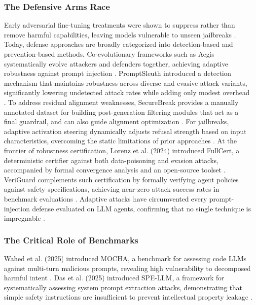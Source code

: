 \documentclass[11pt,a4paper]{article}
\begin{document}
\subsubsection{The Defensive Arms Race}

Early adversarial fine-tuning treatments were shown to suppress rather than remove harmful capabilities, leaving models vulnerable to unseen jailbreaks \cite{Sheshadri_2024_LLMs_ecd68cc1}. Today, defense approaches are broadly categorized into detection-based and prevention-based methods. Co-evolutionary frameworks such as Aegis systematically evolve attackers and defenders together, achieving adaptive robustness against prompt injection \cite{Liu_2025_Aegis_6081be1b}. PromptSleuth introduced a detection mechanism that maintains robustness across diverse and evasive attack variants, significantly lowering undetected attack rates while adding only modest overhead \cite{Wang_2025_Promptsleuth_c8e9516a}. To address residual alignment weaknesses, SecureBreak provides a manually annotated dataset for building post-generation filtering modules that act as a final guardrail, and can also guide alignment optimization \cite{Arazzi_2026_Securebreak_0e3adcf7}. For jailbreaks, adaptive activation steering dynamically adjusts refusal strength based on input characteristics, overcoming the static limitations of prior approaches \cite{Zhao_2025_LLM_45bb4e13}. At the frontier of robustness certification, Lorenz et al. (2024) introduced FullCert, a deterministic certifier against both data-poisoning and evasion attacks, accompanied by formal convergence analysis and an open-source toolset \cite{Lorenz_2024_Fullcert_7dbc4820}. VeriGuard complements such certification by formally verifying agent policies against safety specifications, achieving near-zero attack success rates in benchmark evaluations \cite{Miculicich_2025_LLM_fdef6034}. Adaptive attacks have circumvented every prompt-injection defense evaluated on LLM agents, confirming that no single technique is impregnable \cite{Zhan_2025_LLM_ab9a7822}.

\subsubsection{The Critical Role of Benchmarks}

Wahed et al. (2025) introduced MOCHA, a benchmark for assessing code LLMs against multi-turn malicious prompts, revealing high vulnerability to decomposed harmful intent \cite{Wahed_2025_Mocha_c0ec2d2c}. Das et al. (2025) introduced SPE-LLM, a framework for systematically assessing system prompt extraction attacks, demonstrating that simple safety instructions are insufficient to prevent intellectual property leakage \cite{Das_2025_System_cda316c4}.
\end{document}
